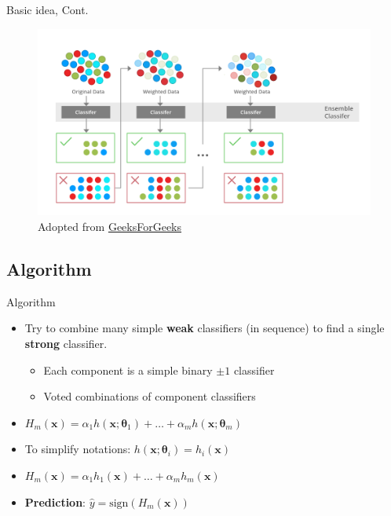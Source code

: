 \documentclass[serif, aspectratio=169]{beamer}
\begin{document}
\begin{frame}{Basic idea, Cont.}
    \begin{center}
    \begin{figure}[bh]
        \includegraphics[width=\textwidth]{pic/boosting.png}
        {\scriptsize Adopted from \href{https://www.geeksforgeeks.org/bagging-vs-boosting-in-machine-learning/}{GeeksForGeeks}}
    \end{figure}
    \endminipage
    \end{center}
\end{frame}

\subsection{Algorithm}

\begin{frame}{Algorithm}
    \begin{itemize}
        \itemsep1em
        \justifying
        \item Try to combine many simple \textbf{weak} classifiers (in sequence) to find a single \textbf{strong} classifier.
        \begin{itemize}
            \itemsep0.25em
            \item Each component is a simple binary $\pm1$ classifier
            \item Voted combinations of component classifiers
        \end{itemize}
        \item[] \begin{center}
        $H_m(\boldsymbol{x})=\alpha_1h(\boldsymbol{x};\boldsymbol{\theta}_1)+\dots+\alpha_mh(\boldsymbol{x};\boldsymbol{\theta}_m)$
        \end{center} 
        \item To simplify notations: $h(\boldsymbol{x};\boldsymbol{\theta}_i)=h_i(\boldsymbol{x})$
        \item[] \begin{center}
            $H_m(\boldsymbol{x})=\alpha_1h_1(\boldsymbol{x})+\dots+\alpha_mh_m(\boldsymbol{x})$
        \end{center}
        \item \textbf{Prediction}: $\hat{y}=\text{sign}(H_m(\boldsymbol{x}))$
    \end{itemize}
\end{frame}
\end{document}
